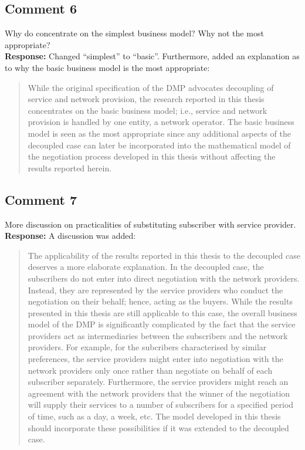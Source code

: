 \documentclass[10pt,a4paper,notitlepage]{article}
\numberwithin{equation}{section}
\begin{document}
\subsection{Comment 6}
Why do concentrate on the simplest business model? Why not the most appropriate?\\[-2ex]

\textbf{Response:}
Changed ``simplest'' to ``basic''. Furthermore, added an explanation as to why the basic business model is the most appropriate:
\begin{quote}
While the original specification of the DMP advocates decoupling of service and network provision, the research reported in this thesis concentrates on the basic business model; i.e., service and network provision is handled by one entity, a network operator. The basic business model is seen as the most appropriate since any additional aspects of the decoupled case can later be incorporated into the mathematical model of the negotiation process developed in this thesis without affecting the results reported herein.
\end{quote}

\subsection{Comment 7}
More discussion on practicalities of substituting subscriber with service provider.\\[-2ex]

\textbf{Response:}
A discussion was added:
\begin{quote}
The applicability of the results reported in this thesis to the decoupled case deserves a more elaborate explanation. In the decoupled case, the subscribers do not enter into direct negotiation with the network providers. Instead, they are represented by the service providers who conduct the negotiation on their behalf; hence, acting as the buyers. While the results presented in this thesis are still applicable to this case, the overall business model of the DMP is significantly complicated by the fact that the service providers act as intermediaries between the subscribers and the network providers. For example, for the subcribers characterised by similar preferences, the service providers might enter into negotiation with the network providers only once rather than negotiate on behalf of each subscriber separately. Furthermore, the service providers might reach an agreement with the network providers that the winner of the negotiation will supply their services to a number of subscribers for a specified period of time, such as a day, a week, etc. The model developed in this thesis should incorporate these possibilities if it was extended to the decoupled case.
\end{quote}
\end{document}
